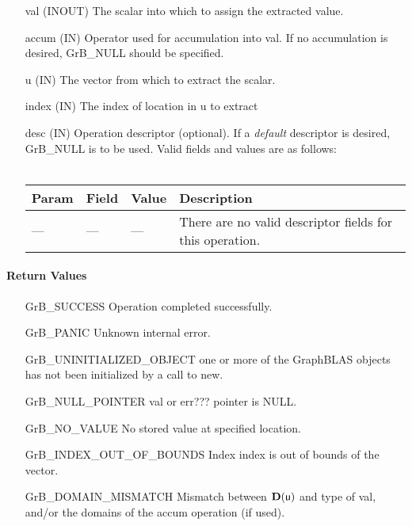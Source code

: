 \begin{itemize}[leftmargin=1in]
    \item[{\sf val}]   ({\sf INOUT}) The scalar into which to assign the extracted value.
    \item[{\sf accum}] ({\sf IN}) Operator used for accumulation into {\sf val}. If no accumulation is desired,
                        {\sf GrB\_NULL} should be specified.
    \item[{\sf u}]     ({\sf IN})  The vector from which to extract the scalar.
    \item[{\sf index}] ({\sf IN}) The index of location in {\sf u} to extract

    \item[{\sf desc}]  ({\sf IN}) Operation descriptor (optional). If a
    \emph{default} descriptor is desired, {\sf GrB\_NULL} is to be
    used.  Valid fields and values are as follows: \\ ~ \\
    \begin{tabular}{lllp{2.5in}}
    Param & Field  & Value & Description \\
    \hline
    {\sf ---} & {\sf ---} & {\sf ---} & There are no valid descriptor fields for this operation. \\
    \end{tabular}

\end{itemize}

\paragraph{Return Values}

\begin{itemize}[leftmargin=2.1in]
\item[{\sf GrB\_SUCCESS}]          Operation completed successfully.
\item[{\sf GrB\_PANIC}]            Unknown internal error.
\item[{\sf GrB\_UNINITIALIZED\_OBJECT}]   one or more of the GraphBLAS objects has
                             not been initialized by a call to {\sf new}.
\item[{\sf GrB\_NULL\_POINTER}]    {\sf val} or {\sf err???} pointer is {\sf NULL}.
\item[{\sf GrB\_NO\_VALUE}]        No stored value at specified location.
\item[{\sf GrB\_INDEX\_OUT\_OF\_BOUNDS}]  Index {\sf index} is out of 
                                      bounds of the vector. 
\item[{\sf GrB\_DOMAIN\_MISMATCH}]    Mismatch between $\bold{D}(\sf u)$ and type of {\sf val},
                                      and/or the domains of the 
                                      {\sf accum} operation (if used).
\end{itemize}

